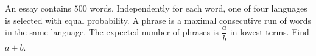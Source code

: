 An essay contains $500$ words. Independently for each word, one of four languages is selected with equal probability. A phrase is a maximal consecutive run of words in the same language. The expected number of phrases is $\dfrac{a}{b}$ in lowest terms. Find $a+b$.
